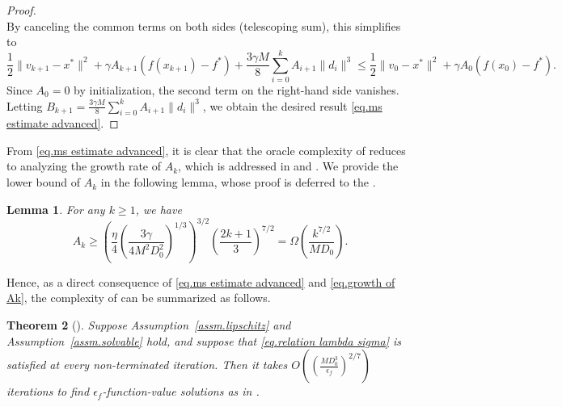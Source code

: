 \documentclass{article}
\newtheorem{theorem}{Theorem}[section]
\newtheorem{lemma}[theorem]{Lemma}
\numberwithin{equation}{section}
\numberwithin{equation}{section}
\begin{document}
\begin{proof}
\begin{equation*}
    \end{equation*}
    By canceling the common terms on both sides (telescoping sum), this simplifies to
    \begin{equation*}
        \frac{1}{2}\|v_{k+1}-x^* \|^2 +\gamma A_{k+1}\left(f(x_{k+1})-f^*\right) + \frac{3\gamma M}{8}\sum_{i=0}^{k}A_{i+1}\|d_i\|^3 \leq \frac{1}{2}\|v_0-x^*\|^2 +\gamma A_0 \left(f(x_0)-f^*\right).
    \end{equation*}
    Since $A_0 = 0$ by initialization, the second term on the right-hand side vanishes. Letting $B_{k+1} = \frac{3\gamma M}{8}\sum_{i=0}^{k}A_{i+1}\|d_i\|^3$, we obtain the desired result \eqref{eq.ms estimate advanced}.
\end{proof}
From \eqref{eq.ms estimate advanced}, it is clear that the oracle complexity of  reduces to analyzing the growth rate of $A_k$, which is addressed in \citet[Lemma 4.2]{monteiro2013accelerated} and \citet[Lemma 4.3.5]{nesterov2018lectures}. We provide the lower bound of $A_k$ in the following lemma, whose proof is deferred to the .
\begin{lemma}
    \label{lem.growth of Ak}
    For any $k\geq 1$, we have
    \begin{equation}
        \label{eq.growth of Ak}
        A_k \geq \left(\frac{\eta}{4}\left (\frac{3\gamma}{4M^2D_0^2}\right)^{1/3}\right)^{3 / 2}\left(\frac{2 k+1}{3}\right)^{7/2} = \Omega\left(\frac{k^{7/2}}{MD_0}\right).
    \end{equation}
\end{lemma}
Hence, as a direct consequence of \eqref{eq.ms estimate advanced} and \eqref{eq.growth of Ak}, the complexity of  can be summarized as follows.
\begin{theorem}
    [{\citet[Theorem 4.3.2]{nesterov2018lectures}}]\label{thm.outer loop complexity}
    Suppose Assumption~\ref{assm.lipschitz} and Assumption~\ref{assm.solvable}
    hold, and suppose that \eqref{eq.relation lambda sigma} is satisfied at every non-terminated
    iteration. Then it takes  $O\left(\left(\frac{MD_0^3}{\epsilon_f}\right)^{2/7}\right)$ iterations to find $\epsilon_f$-function-value solutions as in .
\end{theorem}
\end{document}
